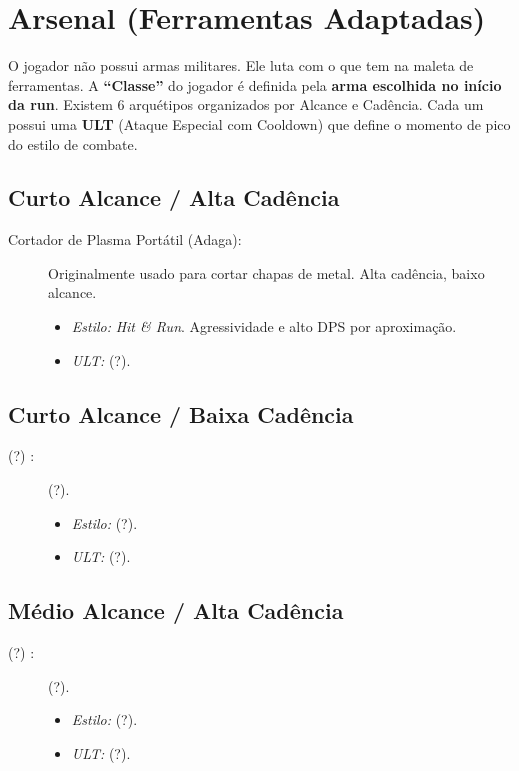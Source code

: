 \documentclass[a4paper,12pt]{report}
\begin{document}
\chapter{Arsenal (Ferramentas Adaptadas)}\label{cap:arsenal}

O jogador não possui armas militares. Ele luta com o que tem na maleta de ferramentas. A \textbf{``Classe''} do jogador é definida pela \textbf{arma escolhida no início da run}. Existem 6 arquétipos organizados por Alcance e Cadência. Cada um possui uma \textbf{ULT} (Ataque Especial com Cooldown) que define o momento de pico do estilo de combate.

\section{Curto Alcance / Alta Cadência}
\begin{description}
    \item[Cortador de Plasma Portátil (Adaga):] Originalmente usado para cortar chapas de metal. Alta cadência, baixo alcance.
    \begin{itemize}
        \item \textit{Estilo:} \textit{Hit \& Run}. Agressividade e alto DPS por aproximação.
        \item \textit{ULT:} (?).
    \end{itemize}
\end{description}

\section{Curto Alcance / Baixa Cadência}
\begin{description}
    \item[(?) :] (?).
    \begin{itemize}
        \item \textit{Estilo:} (?).
        \item \textit{ULT:} (?).
    \end{itemize}
\end{description}

\section{Médio Alcance / Alta Cadência}
\begin{description}
    \item[(?) :] (?).
    \begin{itemize}
        \item \textit{Estilo:} (?).
        \item \textit{ULT:} (?).
    \end{itemize}
\end{description}
\end{document}
